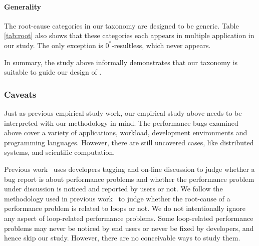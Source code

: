 \paragraph{Generality}
The root-cause categories in our taxonomy are designed to be 
generic. Table \ref{tab:root} also shows that these categories 
each appears in multiple
application in our study. The only exception is $0^*$-resultless, which
never appears. 


In summary, the study above informally demonstrates that our taxonomy
is suitable to guide our design of \Tool.
%

\subsubsection{Caveats} 
Just as previous empirical study work, 
our empirical study above needs to be interpreted with our methodology in mind. 
The performance bugs examined above cover a variety of applications, workload, 
development environments and programming languages. 
However, there are still uncovered cases, like distributed systems, 
and scientific computation. 

Previous work~\cite{PerfBug, SongOOPSLA2014} uses developers tagging and
on-line discussion to judge whether a bug report is about
performance problems and whether 
the performance problem under discussion is noticed and reported by users
or not.
We follow the methodology used in previous work~\cite{SongOOPSLA2014} to judge 
whether the root-cause of a performance problem is related to loops or not.
We do not intentionally ignore any aspect of loop-related performance problems. 
Some loop-related performance problems may never be noticed by end users
or never be fixed by developers, and hence skip our study. However,
there are no conceivable ways to study them. 

